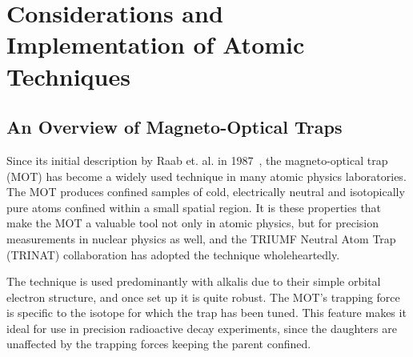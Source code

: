 %
%
%
\clearpage
\chapter{Considerations and Implementation of Atomic Techniques}
\label{atomicphysics_chapter}


\section{An Overview of Magneto-Optical Traps}
\label{section:mot}
Since its initial description by Raab et. al. in 1987~\cite{raabprentiss}, the magneto-optical trap (MOT) has become a widely used technique in many atomic physics laboratories.  The MOT produces confined samples of cold, electrically neutral and isotopically pure atoms confined within a small spatial region.  It is these properties that make the MOT a valuable tool not only in atomic physics, but for precision measurements in nuclear physics as well, and the TRIUMF Neutral Atom Trap (TRINAT) collaboration has adopted the technique wholeheartedly.

The technique is used predominantly with alkalis due to their simple orbital electron structure,%
and once set up it is quite robust.  The MOT's trapping force is specific to the isotope for which the trap has been tuned. This feature makes it ideal for use in precision radioactive decay experiments, since the daughters are unaffected by the trapping forces keeping the parent confined.

